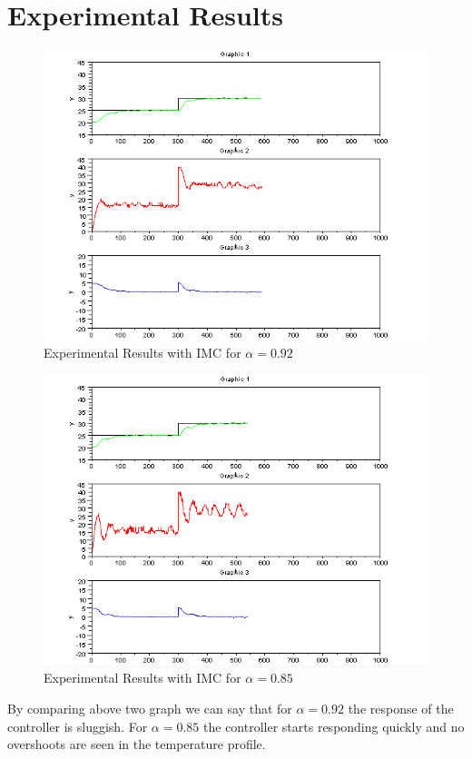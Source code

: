 \section{Experimental Results}
\begin{figure}
	\centering
		\includegraphics[width=\linewidth]{IMC/imc_092_resp.png}
	\caption{Experimental Results with IMC for $\alpha=0.92$}
	\label{fig:0.991}
\end{figure}
\begin{figure}
	\centering
		\includegraphics[width=\linewidth]{IMC/imc_085_resp.png}
		\caption{Experimental Results with IMC for $\alpha=0.85$}
	\label{fig:0.98}
\end{figure}
By comparing above two graph we can say that for $\alpha=0.92$ the response of the controller is sluggish. For $\alpha=0.85$ the controller starts responding quickly and no overshoots are seen in the temperature profile.


